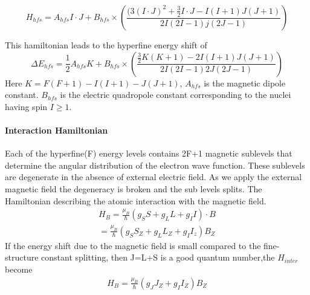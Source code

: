 \documentclass[%
 aapm,
 mph,%
 amsmath,amssymb,
 reprint,%
]{revtex4-2}
\begin{document}
\begin{dmath}
H_{hfs} = A_{hfs} I \cdot J + B_{hfs} \times \left( \frac{(3(I\cdot J)^2+\frac{3}{2}I\cdot J - I(I+1)J(J+1)} {2I(2I-1)j(2J-1)}\right)
\end{dmath}

This hamiltonian leads to the hyperfine energy shift of 
\begin{dmath}
    \Delta E_{hfs} = \frac{1}{2}A_{hfs}K+ B_{hfs}  \times \left(\frac{ \frac{3}{2}K(K+1) -2I(I+1)J(J+1)}{2I(2I-1)2J(2J-1)}\right)
\end{dmath}
Here $K = F(F+1)-I(I+1)-J(J+1)$, $A_{hfs}$ is the magnetic dipole constant. $B_{hfs}$ is the electric quadropole constant corresponding to the nuclei having spin $I\ge 1$.

\paragraph{Interaction Hamiltonian}
Each of the hyperfine(F) energy levels contains 2F+1 magnetic sublevels that determine the angular distribution of the electron wave function. These sublevels are degenerate in the absence of external electric field. As we apply the external magnetic field the degeneracy is broken and the sub levels splits. The Hamiltonian describing the atomic interaction with the magnetic field.\\
\begin{equation}
\begin{aligned}
    H_B = \frac{\mu _B}{\hbar}(g_SS + g_LL + g_II)\cdot B\\
        = \frac{\mu_B}{\hbar}(g_SS_Z + g_LL_Z + g_II_z) B_Z
\end{aligned}
\end{equation}
If the energy shift due to the magnetic field is small compared to the fine-structure constant splitting, then J=L+S is a good quantum number,the $H_{inter}$ become \\

\begin{equation}
\begin{aligned}
    H_B = \frac{\mu_B}{\hbar}(g_JJ_Z + g_II_Z) B_Z
\end{aligned}
\end{equation}
 
\end{document}
